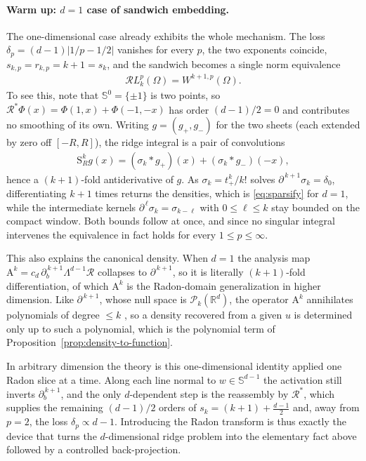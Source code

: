\documentclass[12pt]{article}
\numberwithin{equation}{section}
\numberwithin{figure}{section}
\numberwithin{equation}{section}
\newcommand{\R}{\mathbb{R}}
\newcommand{\Sph}{\mathbb S}
\newcommand{\Pcal}{\mathcal P}
\newcommand{\abs}[1]{\left|#1\right|}
\begin{document}
\paragraph{Warm up: $d=1$ case of sandwich embedding.}
The one-dimensional case already exhibits the whole mechanism. The loss
$\delta_p=(d-1)\abs{1/p-1/2}$ vanishes for every $p$, the two exponents coincide,
$s_{k,p}=r_{k,p}=k+1=s_k$, and the sandwich becomes a single norm equivalence
\begin{align*}
    \mathcal{R}L^p_k(\Omega)=W^{k+1,p}(\Omega).
\end{align*}
To see this, note that $\Sph^{0}=\{\pm1\}$ is two points, so
$\mathcal R^{*}\Phi(x)=\Phi(1,x)+\Phi(-1,-x)$ has order $(d-1)/2=0$ and contributes no
smoothing of its own. Writing $g=(g_+,g_-)$ for the two sheets (each extended by zero
off $[-R,R]$), the ridge integral is a pair of convolutions
\begin{align*}
    \mathrm{S}^k_R g(x)=(\sigma_k\ast g_+)(x)+(\sigma_k\ast g_-)(-x),
\end{align*}
hence a $(k+1)$-fold antiderivative of $g$. As $\sigma_k=t_+^k/k!$ solves
$\partial^{\,k+1}\sigma_k=\delta_0$, differentiating $k+1$ times returns the densities,
which is \eqref{eq:sparsify} for $d=1$, while the intermediate kernels
$\partial^{\,\ell}\sigma_k=\sigma_{k-\ell}$ with $0\le\ell\le k$ stay bounded on the
compact window. Both bounds follow at once, and since no singular integral intervenes
the equivalence in fact holds for every $1\le p\le\infty$.

This also explains the canonical density. When $d=1$ the analysis map
$\mathrm{A}^k =c_d\,\partial_b^{\,k+1}\Lambda^{d-1}\mathcal R$ collapses to
$\partial^{\,k+1}$, so it is literally $(k+1)$-fold differentiation, of which
$\mathrm{A}^k $ is the Radon-domain generalization in higher dimension. Like
$\partial^{\,k+1}$, whose null space is $\Pcal_k(\R^d)$, the operator $\mathrm{A}^k $
annihilates polynomials of degree $\le k$
\cite[Lemma~19]{parhi_banachspacerepresenter_2021}, so a density recovered from a given
$u$ is determined only up to such a polynomial, which is the polynomial term of
Proposition~\ref{prop:density-to-function}. 

In arbitrary dimension the theory is this one-dimensional identity applied one Radon slice at a time. Along each line normal to
$w\in\Sph^{d-1}$ the activation still inverts $\partial_b^{\,k+1}$, and the only
$d$-dependent step is the reassembly by $\mathcal R^{*}$, which supplies the remaining
$(d-1)/2$ orders of $s_k=(k+1)+\tfrac{d-1}{2}$ and, away from $p=2$, the loss
$\delta_p\propto d-1$. Introducing the Radon transform is thus exactly the device that
turns the $d$-dimensional ridge problem into the elementary fact above followed by a
controlled back-projection.
\end{document}

